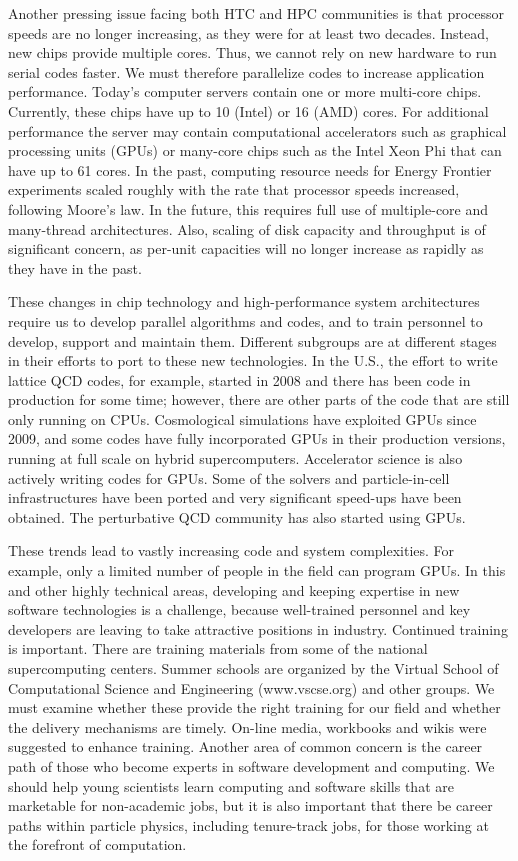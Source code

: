 Another pressing issue facing both HTC and HPC communities is that
processor speeds are no longer increasing, as they were for
at least two decades. Instead, new chips provide multiple
cores. Thus, we cannot rely on new hardware to run serial codes faster.
We must therefore parallelize codes to increase application performance. 
Today's computer servers contain one or more multi-core chips.  Currently,
these chips  have up to 10 (Intel) or 16 (AMD) cores. 
For additional performance the server may contain
computational accelerators such as graphical processing
units (GPUs) or many-core chips such as the Intel Xeon Phi that can have up
to 61 cores. 
In the past, computing resource needs for Energy Frontier experiments scaled
roughly with the rate that processor speeds increased, following Moore's
law. In the future, this requires full use of multiple-core and many-thread 
architectures. Also,
scaling of disk capacity and throughput is of
significant concern, as per-unit capacities will no longer increase as rapidly
as they have in the past.

These changes in chip technology and high-performance system architectures
require us to develop parallel algorithms and codes, and to train personnel
to develop, support and maintain them. Different subgroups are at different
stages in their efforts to port to these new technologies. 
In the U.S., the effort to write lattice QCD codes, for
example, started in 2008 and there has been code in
production for some time; however, there
are other parts of the code that are still only running on CPUs.
Cosmological simulations have exploited GPUs since 2009, and some 
codes have fully incorporated GPUs in their production versions, running 
at full scale on hybrid supercomputers.
Accelerator science is also actively writing codes for GPUs. Some of the
solvers and particle-in-cell infrastructures have been ported and very
significant speed-ups have been obtained. The perturbative QCD community
has also started using GPUs.

These trends lead to vastly increasing code and system complexities. For
example, only a limited number of people in the field can program GPUs. In
this and other highly technical areas, developing and keeping expertise in
new software technologies is a challenge, because well-trained personnel and
key developers are leaving to take attractive positions in industry.
Continued training is important.  There are training materials
from some of the national supercomputing centers.  Summer schools are
organized by the Virtual School of Computational Science and
Engineering (www.vscse.org) and other groups. 
We must examine whether these provide the
right training for our field and whether the delivery mechanisms are
timely.  On-line media, workbooks and wikis were suggested to enhance
training. Another area of common concern is the career path of those who
become experts in software development and computing. We should help
young scientists learn computing and software skills that are marketable
for non-academic jobs, but it is also important that there be career paths
within particle physics, including tenure-track jobs, for those working at
the forefront of computation.

